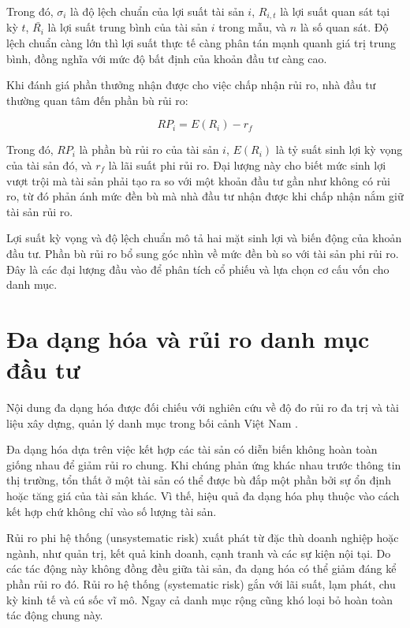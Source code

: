 \documentclass[12pt,a4paper,openany,oneside]{book}
\begin{document}
Trong đó, \({\sigma}_{i}\) là độ lệch chuẩn của lợi suất tài sản \(i\), \({R}_{i,t}\) là lợi suất quan sát tại kỳ \(t\), \(\bar{{R}_{i}}\) là lợi suất trung bình của tài sản \(i\) trong mẫu, và \(n\) là số quan sát. Độ lệch chuẩn càng lớn thì lợi suất thực tế càng phân tán mạnh quanh giá trị trung bình, đồng nghĩa với mức độ bất định của khoản đầu tư càng cao.

Khi đánh giá phần thưởng nhận được cho việc chấp nhận rủi ro, nhà đầu tư thường quan tâm đến phần bù rủi ro:

\begin{equation}\label{eq:theory-05}
R{P}_{i}=E\left({R}_{i}\right)-{r}_{f}
\end{equation}

Trong đó, \(R{P}_{i}\) là phần bù rủi ro của tài sản \(i\), \(E\left({R}_{i}\right)\) là tỷ suất sinh lợi kỳ vọng của tài sản đó, và \({r}_{f}\) là lãi suất phi rủi ro. Đại lượng này cho biết mức sinh lợi vượt trội mà tài sản phải tạo ra so với một khoản đầu tư gần như không có rủi ro, từ đó phản ánh mức đền bù mà nhà đầu tư nhận được khi chấp nhận nắm giữ tài sản rủi ro.

Lợi suất kỳ vọng và độ lệch chuẩn mô tả hai mặt sinh lợi và biến động của khoản đầu tư. Phần bù rủi ro bổ sung góc nhìn về mức đền bù so với tài sản phi rủi ro. Đây là các đại lượng đầu vào để phân tích cổ phiếu và lựa chọn cơ cấu vốn cho danh mục.

\section{Đa dạng hóa và rủi ro danh mục đầu tư}\label{Toc227188420}
Nội dung đa dạng hóa được đối chiếu với nghiên cứu về độ đo rủi ro đa trị \cite{ref02} và tài liệu xây dựng, quản lý danh mục trong bối cảnh Việt Nam \cite{ref04}.

Đa dạng hóa dựa trên việc kết hợp các tài sản có diễn biến không hoàn toàn giống nhau để giảm rủi ro chung. Khi chúng phản ứng khác nhau trước thông tin thị trường, tổn thất ở một tài sản có thể được bù đắp một phần bởi sự ổn định hoặc tăng giá của tài sản khác. Vì thế, hiệu quả đa dạng hóa phụ thuộc vào cách kết hợp chứ không chỉ vào số lượng tài sản.

Rủi ro phi hệ thống (unsystematic risk) xuất phát từ đặc thù doanh nghiệp hoặc ngành, như quản trị, kết quả kinh doanh, cạnh tranh và các sự kiện nội tại. Do các tác động này không đồng đều giữa tài sản, đa dạng hóa có thể giảm đáng kể phần rủi ro đó. Rủi ro hệ thống (systematic risk) gắn với lãi suất, lạm phát, chu kỳ kinh tế và cú sốc vĩ mô. Ngay cả danh mục rộng cũng khó loại bỏ hoàn toàn tác động chung này.
\end{document}
